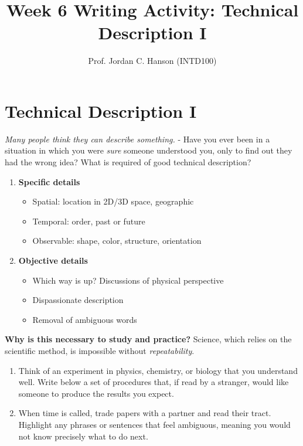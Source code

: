 \documentclass{article}
\begin{document}
\title{Week 6 Writing Activity: Technical Description I}
\author{Prof. Jordan C. Hanson (INTD100)}

\maketitle

\section{Technical Description I}

\textit{Many people think they can describe something.} - Have you ever been in a situation in which you were \textit{sure} someone understood you, only to find out they had the wrong idea?  What is required of good technical description?
\begin{enumerate}
\item \textbf{Specific details}
\begin{itemize}
\item Spatial: location in 2D/3D space, geographic
\item Temporal: order, past or future
\item Observable: shape, color, structure, orientation
\end{itemize}
\item \textbf{Objective details}
\begin{itemize}
\item Which way is up? Discussions of physical perspective
\item Dispassionate description
\item Removal of ambiguous words
\end{itemize}
\end{enumerate}
\textbf{Why is this necessary to study and practice?} Science, which relies on the scientific method, is impossible without \textit{repeatability}.

\begin{enumerate}
\item Think of an experiment in physics, chemistry, or biology that you understand well.  Write below a set of procedures that, if read by a stranger, would like someone to produce the results you expect. \\ \vspace{7cm}
\item When time is called, trade papers with a partner and read their tract.  Highlight any phrases or sentences that feel ambiguous, meaning you would not know precisely what to do next.
\end{enumerate}
\end{document}
